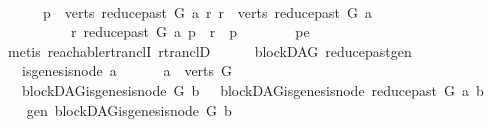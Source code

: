 \begin{isabellebody}
\ \ \ \ \ \ \ \ \isamarkupfalse%
\isanewline
\ \ \ \ \ \ \isamarkupfalse%
\isanewline
\ \ \ \ \isamarkupfalse%
\isanewline
\ \ \ \ \isamarkupfalse%
\ \isanewline
\ \ \ \ \ \ {\isachardoublequoteopen}{\isasymexists}p\ {\isasymin}\ verts\ {\isacharparenleft}{\kern0pt}reduce{\isacharunderscore}{\kern0pt}past\ G\ a{\isacharparenright}{\kern0pt}{\isachardot}{\kern0pt}\ {\isacharparenleft}{\kern0pt}{\isasymforall}r{\isachardot}{\kern0pt}\ r\ {\isasymin}\ verts\ {\isacharparenleft}{\kern0pt}reduce{\isacharunderscore}{\kern0pt}past\ G\ a{\isacharparenright}{\kern0pt}\isanewline
\ \ \ \ \ \ \ \ \ {\isasymlongrightarrow}\ {\isacharparenleft}{\kern0pt}r\ {\isasymrightarrow}\isactrlsup {\isacharplus}{\kern0pt}\isactrlbsub reduce{\isacharunderscore}{\kern0pt}past\ G\ a\isactrlesub \ p\ {\isasymor}\ r\ {\isacharequal}{\kern0pt}\ p{\isacharparenright}{\kern0pt}{\isacharparenright}{\kern0pt}{\isachardoublequoteclose}\isanewline
\ \ \ \ \ \ \isamarkupfalse%
\ pe\isanewline
\ \ \ \ \ \ \isamarkupfalse%
\ {\isacharparenleft}{\kern0pt}metis\ reachable{\isacharunderscore}{\kern0pt}rtranclI\ rtranclD{\isacharparenright}{\kern0pt}\ \isanewline
\ \ \isamarkupfalse%
\isanewline
{}\isamarkupfalse%
%
\endisatagproof
{\isafoldproof}%
%
\isadelimproof
\isanewline
%
\endisadelimproof
\isanewline
\isanewline
\isanewline
{}\isamarkupfalse%
\ {\isacharparenleft}{\kern0pt}\ blockDAG{\isacharparenright}{\kern0pt}\ reduce{\isacharunderscore}{\kern0pt}past{\isacharunderscore}{\kern0pt}gen{\isacharcolon}{\kern0pt}\isanewline
\ \ \ {\isachardoublequoteopen}{\isasymnot}is{\isacharunderscore}{\kern0pt}genesis{\isacharunderscore}{\kern0pt}node\ a{\isachardoublequoteclose}\ \isanewline
\ \ \ \ \ {\isachardoublequoteopen}a\ {\isasymin}\ verts\ G{\isachardoublequoteclose}\isanewline
\ \ \ {\isachardoublequoteopen}blockDAG{\isachardot}{\kern0pt}is{\isacharunderscore}{\kern0pt}genesis{\isacharunderscore}{\kern0pt}node\ G\ b\ {\isasymLongrightarrow}\ \ blockDAG{\isachardot}{\kern0pt}is{\isacharunderscore}{\kern0pt}genesis{\isacharunderscore}{\kern0pt}node\ {\isacharparenleft}{\kern0pt}reduce{\isacharunderscore}{\kern0pt}past\ G\ a{\isacharparenright}{\kern0pt}\ b{\isachardoublequoteclose}\isanewline
%
\isadelimproof
%
\endisadelimproof
%
\isatagproof
{}\isamarkupfalse%
\ {\isacharminus}{\kern0pt}\isanewline
\ \ \isamarkupfalse%
\ gen{\isacharcolon}{\kern0pt}\ {\isachardoublequoteopen}blockDAG{\isachardot}{\kern0pt}is{\isacharunderscore}{\kern0pt}genesis{\isacharunderscore}{\kern0pt}node\ G\ b{\isachardoublequoteclose}\isanewline

\end{isabellebody}
